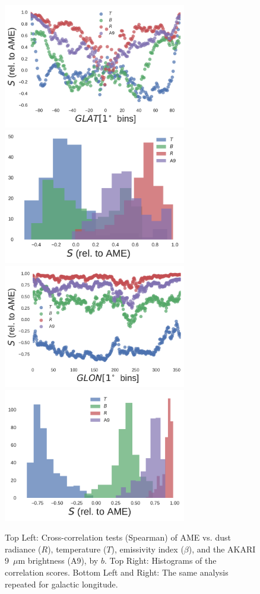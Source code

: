 \documentclass[preprint2,longabstract]{aastex}
\begin{document}
      \begin{figure}
        \label{fig:PlanckModBBvsAMEandA9}
        \includegraphics[width=80mm]{../Plots/PlanckModBBvsAMEandA9_byGLAT.pdf}
        \includegraphics[width=80mm]{../Plots/PlanckModBBvsAMEandA9_GLAT_hist.pdf}
        \includegraphics[width=80mm]{../Plots/PlanckModBBvsAMEandA9_byGLON.pdf}
        \includegraphics[width=80mm]{../Plots/PlanckModBBvsAMEandA9_GLON_hist.pdf}
        \centering
        \caption{Top Left: Cross-correlation tests (Spearman) of AME vs. dust radiance ($R$), temperature ($T$),  emissivity index ($\beta$), and the AKARI 9~$\mu$m brightness (A9), by $b$. Top Right: Histograms of the correlation scores. Bottom Left and Right: The same analysis repeated for galactic longitude. }
      \end{figure}
\end{document}
